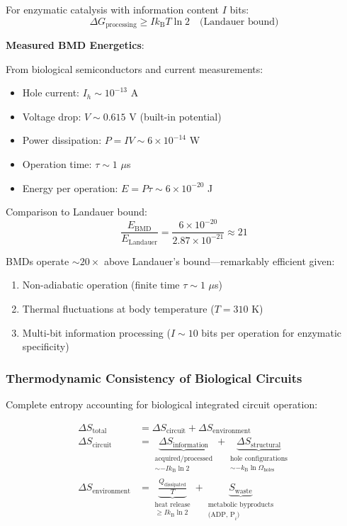 \documentclass[11pt,a4paper]{article}
\newcommand{\kB}{k_\text{B}}
\begin{document}
For enzymatic catalysis with information content $I$ bits:
\begin{equation}
\Delta G_{\text{processing}} \geq I \kB T \ln 2 \quad \text{(Landauer bound)}
\end{equation}

\textbf{Measured BMD Energetics}:

From biological semiconductors and current measurements:
\begin{itemize}
\item Hole current: $I_h \sim 10^{-13}$ A
\item Voltage drop: $V \sim 0.615$ V (built-in potential)
\item Power dissipation: $P = IV \sim 6 \times 10^{-14}$ W
\item Operation time: $\tau \sim 1$ $\mu$s
\item Energy per operation: $E = P\tau \sim 6 \times 10^{-20}$ J
\end{itemize}

Comparison to Landauer bound:
\begin{equation}
\frac{E_{\text{BMD}}}{E_{\text{Landauer}}} = \frac{6 \times 10^{-20}}{2.87 \times 10^{-21}} \approx 21
\end{equation}

BMDs operate $\sim 20\times$ above Landauer's bound—remarkably efficient given:
\begin{enumerate}
\item Non-adiabatic operation (finite time $\tau \sim 1$ $\mu$s)
\item Thermal fluctuations at body temperature ($T = 310$ K)
\item Multi-bit information processing ($I \sim 10$ bits per operation for enzymatic specificity)
\end{enumerate}

\subsubsection{Thermodynamic Consistency of Biological Circuits}

Complete entropy accounting for biological integrated circuit operation:

\begin{align}
\Delta S_{\text{total}} &= \Delta S_{\text{circuit}} + \Delta S_{\text{environment}} \\
\Delta S_{\text{circuit}} &= \underbrace{\Delta S_{\text{information}}}_{\substack{\text{acquired/processed} \\ \sim -I \kB \ln 2}} + \underbrace{\Delta S_{\text{structural}}}_{\substack{\text{hole configurations} \\ \sim -\kB \ln \Omega_{\text{holes}}}} \\
\Delta S_{\text{environment}} &= \underbrace{\frac{Q_{\text{dissipated}}}{T}}_{\substack{\text{heat release} \\ \geq I \kB \ln 2}} + \underbrace{S_{\text{waste}}}_{\substack{\text{metabolic byproducts} \\ \text{(ADP, P}_i\text{)}}}
\end{align}
\end{document}
